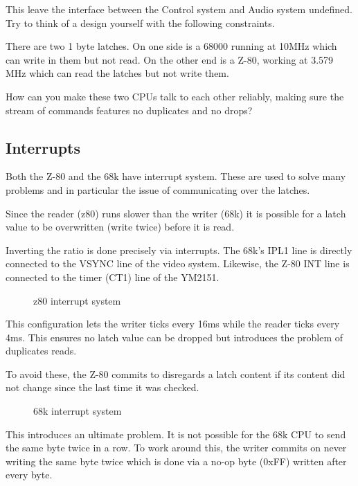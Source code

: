 This leave the interface between the Control system and Audio system undefined. Try to think of a design yourself with the following constraints.

There are two 1 byte latches. On one side is a 68000 running at 10MHz which can write in them but not read. On the other end is a Z-80, working at 3.579 MHz which can read the latches but not write them. 

How can you make these two CPUs talk to each other reliably, making sure the stream of commands features no duplicates and no drops?

\subsection{Interrupts}

Both the Z-80 and the 68k have interrupt system. These are used to solve many problems and in particular the issue of communicating over the latches.

Since the reader (z80) runs slower than the writer (68k) it is possible for a latch value to be overwritten (write twice) before it is read. 

Inverting the ratio is done precisely via interrupts. The 68k's IPL1 line is directly connected to the VSYNC line of the video system. Likewise, the Z-80 INT line is connected to the timer (CT1) line of the YM2151.

\begin{figure}[H]
\caption*{z80 interrupt system}
\end{figure}

This configuration lets the writer ticks every 16ms while the reader ticks every 4ms. This ensures no latch value can be dropped but introduces the problem of duplicates reads.

To avoid these, the Z-80 commits to disregards a latch content if its content did not change since the last time it was checked.

\begin{figure}[H]
\caption*{68k interrupt system}
\end{figure}

This introduces an ultimate problem. It is not possible for the 68k CPU to send the same byte twice in a row. To work around this, the writer commits on never writing the same byte twice which is done via a no-op byte (0xFF) written after every byte.




